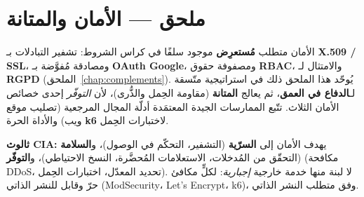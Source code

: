 
\chapter{ملحق --- الأمان والمتانة}
\label{chap:securite}
الأمان متطلب \textbf{مُستعرِض} موجود سلفًا في كراس الشروط: تشفير التبادلات بـ
\textbf{X.509 / SSL}، ومصادقة مُفوَّضة بـ \textbf{OAuth Google}، ومصفوفة حقوق
\textbf{RBAC}، والامتثال لـ \textbf{RGPD} (الملحق~\ref{chap:complements}).
يُوحّد هذا الملحق ذلك في استراتيجية متّسقة لـ\textbf{الدفاع في العمق}، ثم يعالج
\textbf{المتانة} (مقاومة الحِمل والذُّرى)، لأن \emph{التوفّر} إحدى خصائص الأمان
الثلاث. تتّبع الممارسات الجيدة المعتمَدة أدلّة المجال المرجعية (تصليب موقع ويب)
والأداة الحرة \textbf{k6} لاختبارات الحِمل.

\begin{encadre}
\textbf{ثالوث CIA:} يهدف الأمان إلى \textbf{السرّية} (التشفير، التحكّم في
الوصول)، و\textbf{السلامة} (التحقّق من المُدخلات، الاستعلامات المُحضَّرة، النسخ
الاحتياطي)، و\textbf{التوفّر} (مكافحة DDoS، تحديد المعدّل، اختبارات الحِمل). لا
لبنة منها خدمة خارجية \emph{إجبارية}: لكلٍّ مكافئ حرّ وقابل للنشر الذاتي
(ModSecurity، Let's Encrypt، k6)، وفق متطلب النشر الذاتي.
\end{encadre}

